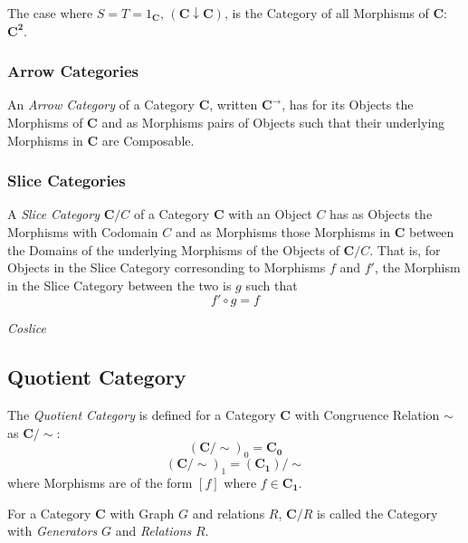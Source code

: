 The case where $S = T = 1_\mathbf{C}$, $(\mathbf{C} \downarrow
\mathbf{C})$, is the Category of all Morphisms of $\mathbf{C}$:
$\mathbf{C}^\mathbf{2}$.



\subsubsection{Arrow Categories}\label{subsec:arrow_categories}

An \emph{Arrow Category} of a Category $\mathbf{C}$, written
$\mathbf{C^{\rightarrow}}$, has for its Objects the Morphisms of
$\mathbf{C}$ and as Morphisms pairs of Objects such that their
underlying Morphisms in $\mathbf{C}$ are Composable.



\subsubsection{Slice Categories}\label{subsec:slice_categories}

A \emph{Slice Category} $\mathbf{C}/C$ of a Category $\mathbf{C}$ with
an Object $C$ has as Objects the Morphisms with Codomain $C$ and as
Morphisms those Morphisms in $\mathbf{C}$ between the Domains of the
underlying Morphisms of the Objects of $\mathbf{C}/C$. That is, for
Objects in the Slice Category corresonding to Morphisms $f$ and $f'$,
the Morphism in the Slice Category between the two is $g$ such that
\[
    f' \circ g = f
\]

\emph{Coslice}



\subsection{Quotient Category}\label{subsec:quotient_category}


The \emph{Quotient Category} is defined for a Category $\mathbf{C}$
with Congruence Relation $\sim$ as $\mathbf{C}/\sim$:
\[
    (\mathbf{C}/\sim)_0 = \mathbf{C_0}
\]\[
    (\mathbf{C}/\sim)_1 = (\mathbf{C_1})/\sim
\]
where Morphisms are of the form $[f]$ where $f \in \mathbf{C_1}$.

For a Category $\mathbf{C}$ with Graph $G$ and relations $R$,
$\mathbf{C}/R$ is called the Category with \emph{Generators} $G$ and
\emph{Relations} $R$.




